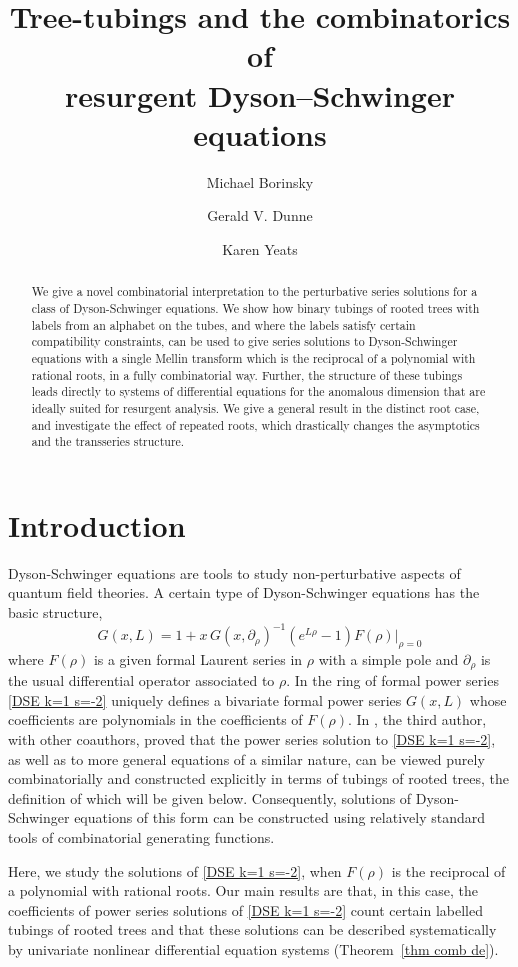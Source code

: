 \documentclass[oneside]{amsart}
\title[Tree-tubings and the combinatorics of resurgent Dyson--Schwinger equations]{Tree-tubings and the combinatorics of\\ resurgent Dyson--Schwinger equations}
\author{Michael Borinsky \and Gerald V. Dunne \and Karen Yeats}
\theoremstyle{definition}
\begin{document}
\begin{abstract}
    We give a novel combinatorial interpretation to the perturbative series solutions for a class of Dyson-Schwinger equations.  We show how binary tubings of rooted trees with labels from an alphabet on the tubes, and where the labels satisfy certain compatibility constraints, can be used to give series solutions to Dyson-Schwinger equations with a single Mellin transform which is the reciprocal of a polynomial with rational roots, in a fully combinatorial way.  Further, the structure of these tubings leads directly to systems of differential equations for the anomalous dimension that are ideally suited for resurgent analysis.  We give a general result in the distinct root case, and investigate the effect of repeated roots, which drastically changes the asymptotics and the transseries structure.
\end{abstract}

\maketitle
\section{Introduction}

Dyson-Schwinger equations are tools to study non-perturbative aspects of quantum field theories. A certain type of Dyson-Schwinger equations has the basic structure,
\begin{equation}\label{DSE k=1 s=-2}
G(x,L) = 1 + x\, G(x, \partial_\rho)^{-1} (e^{L\rho}-1)F(\rho)|_{\rho=0}
\end{equation}
where $F(\rho)$ is a given formal Laurent series in $\rho$ with a simple pole and $\partial_\rho$ is the usual differential operator associated to $\rho$.
In the ring of formal power series \eqref{DSE k=1 s=-2} uniquely defines a bivariate formal power series $G(x,L) $ whose coefficients are polynomials in the coefficients of $F(\rho)$. In \cite{BCEFNOHY}, the third author, with other coauthors, proved that the power series solution to \eqref{DSE k=1 s=-2}, as well as to more general equations of a similar nature, can be viewed purely combinatorially and constructed explicitly in terms of tubings of rooted trees, the definition of which will be given below. Consequently, solutions of Dyson-Schwinger equations of this form can be constructed using relatively standard tools of combinatorial generating functions.

Here, we study the solutions of \eqref{DSE k=1 s=-2}, when $F(\rho)$ is the reciprocal of a polynomial with rational roots.
%
%
%
%
%
Our main results are that, in this case, the coefficients of power series solutions of \eqref{DSE k=1 s=-2} 
%
count certain labelled tubings of rooted trees and that these solutions can be
described systematically by univariate nonlinear differential equation systems (Theorem~\ref{thm comb de}).
\end{document}

